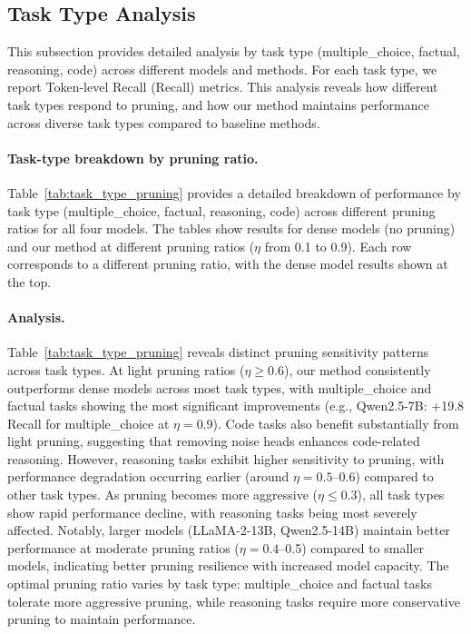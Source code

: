 \subsection{Task Type Analysis}
\label{app:task_type_analysis}

This subsection provides detailed analysis by task type (multiple\_choice, factual, reasoning, code) across different models and methods. 
For each task type, we report Token-level Recall (Recall) metrics.
This analysis reveals how different task types respond to pruning, and how our method maintains performance across diverse task types compared to baseline methods.

\paragraph{Task-type breakdown by pruning ratio.}
Table~\ref{tab:task_type_pruning} provides a detailed breakdown of performance by task type (multiple\_choice, factual, reasoning, code) across different pruning ratios for all four models.
The tables show results for dense models (no pruning) and our method at different pruning ratios ($\eta$ from 0.1 to 0.9).
Each row corresponds to a different pruning ratio, with the dense model results shown at the top.

\paragraph{Analysis.}
Table~\ref{tab:task_type_pruning} reveals distinct pruning sensitivity patterns across task types. At light pruning ratios ($\eta \geq 0.6$), our method consistently outperforms dense models across most task types, with multiple\_choice and factual tasks showing the most significant improvements (e.g., Qwen2.5-7B: +19.8 Recall for multiple\_choice at $\eta=0.9$). Code tasks also benefit substantially from light pruning, suggesting that removing noise heads enhances code-related reasoning. However, reasoning tasks exhibit higher sensitivity to pruning, with performance degradation occurring earlier (around $\eta=0.5$--0.6) compared to other task types. As pruning becomes more aggressive ($\eta \leq 0.3$), all task types show rapid performance decline, with reasoning tasks being most severely affected. Notably, larger models (LLaMA-2-13B, Qwen2.5-14B) maintain better performance at moderate pruning ratios ($\eta=0.4$--0.5) compared to smaller models, indicating better pruning resilience with increased model capacity. The optimal pruning ratio varies by task type: multiple\_choice and factual tasks tolerate more aggressive pruning, while reasoning tasks require more conservative pruning to maintain performance.

